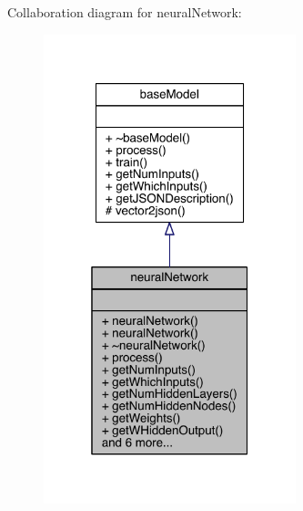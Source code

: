 Collaboration diagram for neural\+Network\+:\nopagebreak
\begin{figure}[H]
\begin{center}
\leavevmode
\includegraphics[width=208pt]{classneural_network__coll__graph}
\end{center}
\end{figure}

